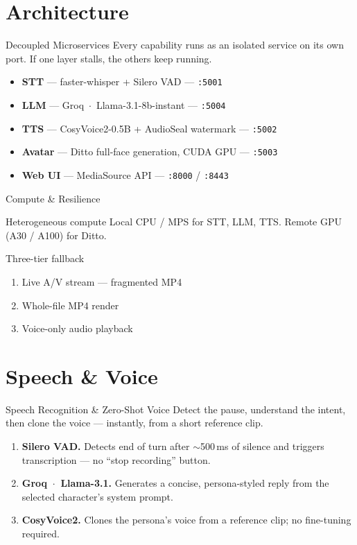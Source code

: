 \documentclass[11pt]{beamer}
\begin{document}
\section{Architecture}

\begin{frame}{Decoupled Microservices}
  Every capability runs as an isolated service on its own port. If one layer stalls, the others keep running.
  \begin{itemize}
    \item \textbf{STT} --- faster-whisper + Silero VAD --- \texttt{:5001}
    \item \textbf{LLM} --- Groq \,$\cdot$\, Llama-3.1-8b-instant --- \texttt{:5004}
    \item \textbf{TTS} --- CosyVoice2-0.5B + AudioSeal watermark --- \texttt{:5002}
    \item \textbf{Avatar} --- Ditto full-face generation, CUDA GPU --- \texttt{:5003}
    \item \textbf{Web UI} --- MediaSource API --- \texttt{:8000} / \texttt{:8443}
  \end{itemize}
\end{frame}

\begin{frame}{Compute \& Resilience}
  \begin{block}{Heterogeneous compute}
    Local CPU / MPS for STT, LLM, TTS. Remote GPU (A30 / A100) for Ditto.
  \end{block}
  \begin{block}{Three-tier fallback}
    \begin{enumerate}
      \item Live A/V stream --- fragmented MP4
      \item Whole-file MP4 render
      \item Voice-only audio playback
    \end{enumerate}
  \end{block}
\end{frame}

\section{Speech \& Voice}

\begin{frame}{Speech Recognition \& Zero-Shot Voice}
  Detect the pause, understand the intent, then clone the voice --- instantly, from a short reference clip.
  \begin{enumerate}
    \item \textbf{Silero VAD.} Detects end of turn after $\sim$500\,ms of silence and triggers transcription --- no ``stop recording'' button.
    \item \textbf{Groq \,$\cdot$\, Llama-3.1.} Generates a concise, persona-styled reply from the selected character's system prompt.
    \item \textbf{CosyVoice2.} Clones the persona's voice from a reference clip; no fine-tuning required.
  \end{enumerate}
\end{frame}
\end{document}
